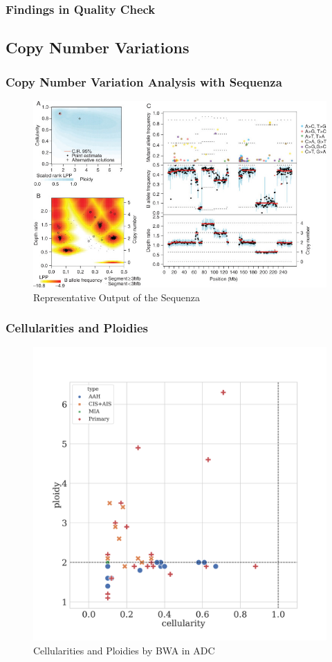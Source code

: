 \documentclass[a4paper]{article}
\begin{document}
            \subsubsection{Findings in Quality Check}

        \subsection{Copy Number Variations}
            \subsubsection{Copy Number Variation Analysis with Sequenza}
                \begin{figure}[htbp]
                    \centering
                    \includegraphics[width=0.6 \linewidth]{figures/Workflow/sequenza.jpg}
                    \caption{Representative Output of the Sequenza \protect\cite{sequenza1}}
                    \label{fig:Sequenza}
                \end{figure}

            \subsubsection{Cellularities and Ploidies}
                \begin{figure}[htbp]
                    \centering
                    \includegraphics[width=0.6 \linewidth]{figures/Sequenza/BWA-sequenza-ADC.pdf}
                    \caption{Cellularities and Ploidies by BWA in ADC}
                    \label{fig:sequenza-BWA-ADC}
                \end{figure}
\end{document}
